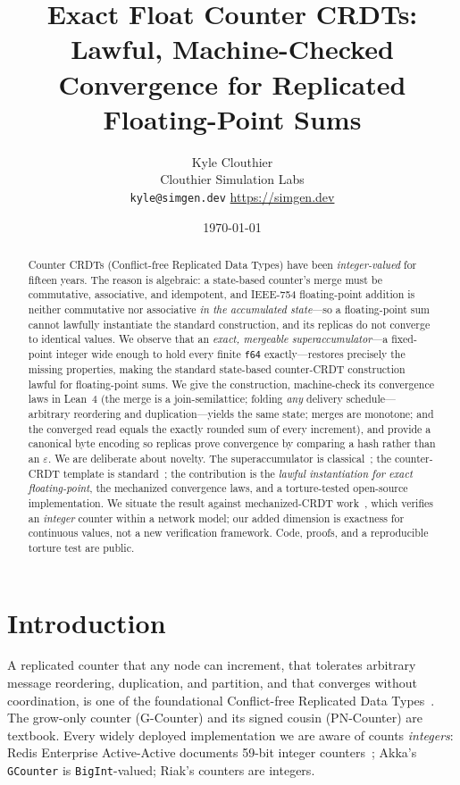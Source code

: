 \documentclass[11pt]{article}
\title{Exact Float Counter CRDTs:\\
Lawful, Machine-Checked Convergence for Replicated Floating-Point Sums}
\author{Kyle Clouthier\\
\small Clouthier Simulation Labs \\
\small \texttt{kyle@simgen.dev} \quad \url{https://simgen.dev}}
\date{\today}
\begin{document}
\maketitle

\begin{abstract}
Counter CRDTs (Conflict-free Replicated Data Types) have been \emph{integer-valued} for fifteen years.
The reason is algebraic: a state-based counter's merge must be commutative, associative, and idempotent,
and IEEE-754 floating-point addition is neither commutative nor associative \emph{in the accumulated
state}---so a floating-point sum cannot lawfully instantiate the standard construction, and its replicas
do not converge to identical values. We observe that an \emph{exact, mergeable superaccumulator}---a
fixed-point integer wide enough to hold every finite \texttt{f64} exactly---restores precisely the
missing properties, making the standard state-based counter-CRDT construction lawful for floating-point
sums. We give the construction, machine-check its convergence laws in Lean~4 (the merge is a
join-semilattice; folding \emph{any} delivery schedule---arbitrary reordering and duplication---yields the
same state; merges are monotone; and the converged read equals the exactly rounded sum of every
increment), and provide a canonical byte encoding so replicas prove convergence by comparing a hash
rather than an $\varepsilon$. We are deliberate about novelty. The superaccumulator is
classical~\cite{kulisch,neal,demmel}; the counter-CRDT template is standard~\cite{shapiro}; the
contribution is the \emph{lawful instantiation for exact floating-point}, the mechanized convergence
laws, and a torture-tested open-source implementation. We situate the result against mechanized-CRDT
work~\cite{gomes}, which verifies an \emph{integer} counter within a network model; our added dimension
is exactness for continuous values, not a new verification framework. Code, proofs, and a reproducible
torture test are public.
\end{abstract}

\section{Introduction}

A replicated counter that any node can increment, that tolerates arbitrary message reordering,
duplication, and partition, and that converges without coordination, is one of the foundational
Conflict-free Replicated Data Types~\cite{shapiro}. The grow-only counter (G-Counter) and its
signed cousin (PN-Counter) are textbook. Every widely deployed implementation we are aware of counts
\emph{integers}: Redis Enterprise Active-Active documents 59-bit integer counters~\cite{redisdocs};
Akka's \texttt{GCounter} is \texttt{BigInt}-valued; Riak's counters are integers.
\end{document}
